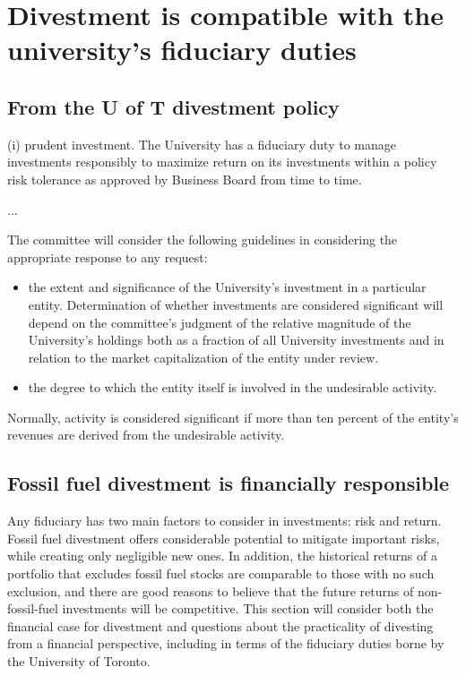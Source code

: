 


		\singlespacing
		\section {Divestment is compatible with the university's fiduciary duties}
		\label{sec:Fiduciary}
		\doublespacing
		


		\subsection {From the U of T divestment policy}
		
		
		
\begin{itquote}    
(i) prudent investment. The University has a fiduciary duty to manage investments responsibly to maximize return on its investments within a policy risk tolerance as approved by Business Board from time to time.

...

The committee will consider the following guidelines in considering the appropriate response to any request:
\begin{itemize}
  \item the extent and significance of the University's investment in a particular entity. Determination of whether investments are considered significant will depend on the committee's judgment of the relative magnitude of the University's holdings both as a fraction of all University investments and in relation to the market capitalization of the entity under review.
  \item the degree to which the entity itself is involved in the undesirable activity.
\end{itemize}
Normally, activity is considered significant if more than ten percent of the entity's revenues are derived from the undesirable activity.
\end{itquote}



	\subsection{Fossil fuel divestment is financially responsible}

	

Any fiduciary has two main factors to consider in investments: risk and return.
Fossil fuel divestment offers considerable potential to mitigate important risks, while creating only negligible new ones.
In addition, the historical returns of a portfolio that excludes fossil fuel stocks are comparable to those with no such exclusion, and there are good reasons to believe that the future returns of non-fossil-fuel investments will be competitive.
This section will consider both the financial case for divestment and questions about the practicality of divesting from a financial perspective, including in terms of the fiduciary duties borne by the University of Toronto.



